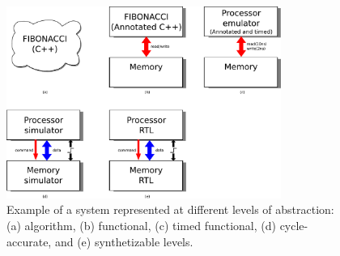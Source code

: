 {\begin{figure}[htb]
	\begin{center}
		\includegraphics[width=0.8\textwidth]{introduction/figures/abstraction_level_example.pdf}
	\end{center}
	\caption{Example of a system represented at different levels of abstraction: (a) algorithm, (b) functional, (c) timed functional, (d) cycle-accurate, and (e) synthetizable levels.}
	\label{fig:abstraction_level_example}
\end{figure}

}

